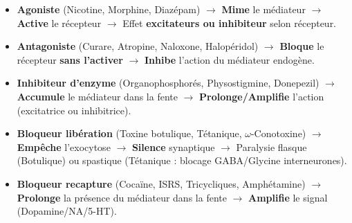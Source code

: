 \documentclass[11pt]{article}
\begin{document}
\begin{aretenir}
\begin{itemize}
\item \textbf{Agoniste} (Nicotine, Morphine, Diazépam) $\rightarrow$ \textbf{Mime} le médiateur $\rightarrow$ \textbf{Active} le récepteur $\rightarrow$ Effet \textbf{excitateurs ou inhibiteur} selon récepteur.
\item \textbf{Antagoniste} (Curare, Atropine, Naloxone, Halopéridol) $\rightarrow$ \textbf{Bloque} le récepteur \textbf{sans l'activer} $\rightarrow$ \textbf{Inhibe} l'action du médiateur endogène.
\item \textbf{Inhibiteur d'enzyme} (Organophosphorés, Physostigmine, Donepezil) $\rightarrow$ \textbf{Accumule} le médiateur dans la fente $\rightarrow$ \textbf{Prolonge/Amplifie} l'action (excitatrice ou inhibitrice).
\item \textbf{Bloqueur libération} (Toxine botulique, Tétanique, $\omega$-Conotoxine) $\rightarrow$ \textbf{Empêche} l'exocytose $\rightarrow$ \textbf{Silence} synaptique $\rightarrow$ Paralysie flasque (Botulique) ou spastique (Tétanique : blocage GABA/Glycine interneurones).
\item \textbf{Bloqueur recapture} (Cocaïne, ISRS, Tricycliques, Amphétamine) $\rightarrow$ \textbf{Prolonge} la présence du médiateur dans la fente $\rightarrow$ \textbf{Amplifie} le signal (Dopamine/NA/5-HT).
\end{itemize}
\end{aretenir}
\end{document}
